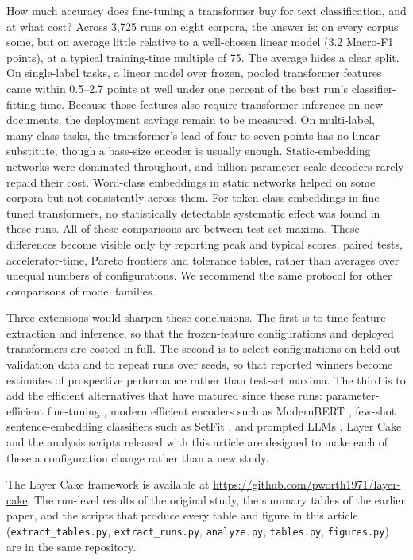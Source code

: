 \documentclass{ijis}
\begin{document}
How much accuracy does fine-tuning a transformer buy for text classification, and at what cost? Across 3,725 runs on eight corpora, the answer is: on every corpus some, but on average little relative to a well-chosen linear model (3.2 Macro-F1 points), at a typical training-time multiple of 75. The average hides a clear split. On single-label tasks, a linear model over frozen, pooled transformer features came within 0.5--2.7 points at well under one percent of the best run's classifier-fitting time. Because those features also require transformer inference on new documents, the deployment savings remain to be measured. On multi-label, many-class tasks, the transformer's lead of four to seven points has no linear substitute, though a base-size encoder is usually enough. Static-embedding networks were dominated throughout, and billion-parameter-scale decoders rarely repaid their cost. Word-class embeddings in static networks helped on some corpora but not consistently across them. For token-class embeddings in fine-tuned transformers, no statistically detectable systematic effect was found in these runs. All of these comparisons are between test-set maxima. These differences become visible only by reporting peak and typical scores, paired tests, accelerator-time, Pareto frontiers and tolerance tables, rather than averages over unequal numbers of configurations. We recommend the same protocol for other comparisons of model families.

Three extensions would sharpen these conclusions. The first is to time feature extraction and inference, so that the frozen-feature configurations and deployed transformers are costed in full. The second is to select configurations on held-out validation data and to repeat runs over seeds, so that reported winners become estimates of prospective performance rather than test-set maxima. The third is to add the efficient alternatives that have matured since these runs: parameter-efficient fine-tuning \cite{hu2021loralowrankadaptationlarge,dettmers2023qloraefficientfinetuningquantized}, modern efficient encoders such as ModernBERT \cite{warner2024modernbert}, few-shot sentence-embedding classifiers such as SetFit \cite{tunstall2022setfit}, and prompted LLMs \cite{edwards2024language}. Layer Cake and the analysis scripts released with this article are designed to make each of these a configuration change rather than a new study.

The Layer Cake framework is available at \url{https://github.com/pworth1971/layer-cake}. The run-level results of the original study, the summary tables of the earlier paper, and the scripts that produce every table and figure in this article (\texttt{extract\_tables.py}, \texttt{extract\_runs.py}, \texttt{analyze.py}, \texttt{tables.py}, \texttt{figures.py}) are in the same repository.
\end{document}
